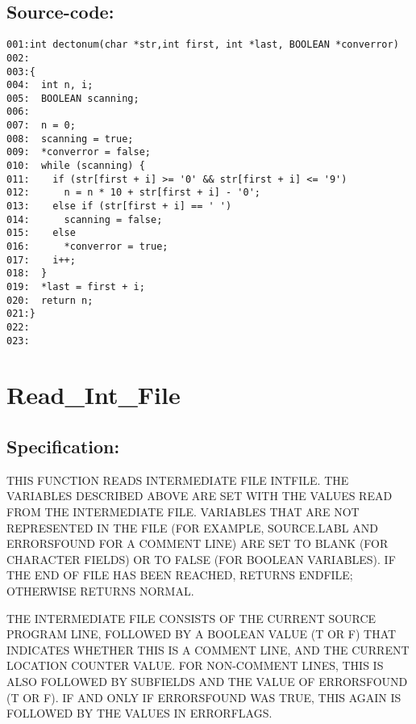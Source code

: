 \subsection*{Source-code:}
\begin{verbatim}
001:int dectonum(char *str,int first, int *last, BOOLEAN *converror)
002:
003:{
004:  int n, i;
005:  BOOLEAN scanning;
006:
007:  n = 0;
008:  scanning = true;
009:  *converror = false;
010:  while (scanning) {
011:    if (str[first + i] >= '0' && str[first + i] <= '9')
012:      n = n * 10 + str[first + i] - '0';
013:    else if (str[first + i] == ' ')
014:      scanning = false;
015:    else 
016:      *converror = true;
017:    i++;
018:  }
019:  *last = first + i;
020:  return n;
021:}
022:
023:
\end{verbatim}
\section{Read\_Int\_File}
\subsection*{Specification:}
THIS FUNCTION READS INTERMEDIATE FILE INTFILE.  THE VARIABLES DESCRIBED ABOVE
ARE SET WITH THE VALUES READ FROM THE INTERMEDIATE FILE. VARIABLES THAT ARE
NOT REPRESENTED IN THE FILE (FOR EXAMPLE, SOURCE.LABL AND ERRORSFOUND FOR A
COMMENT LINE) ARE SET TO BLANK (FOR CHARACTER FIELDS) OR TO FALSE (FOR
BOOLEAN VARIABLES). IF THE END OF FILE HAS BEEN REACHED, RETURNS ENDFILE;
OTHERWISE RETURNS NORMAL.

THE INTERMEDIATE FILE CONSISTS OF THE CURRENT SOURCE PROGRAM LINE, FOLLOWED
BY A BOOLEAN VALUE (T OR F) THAT INDICATES WHETHER THIS IS A COMMENT LINE,
AND THE CURRENT LOCATION COUNTER VALUE. FOR NON-COMMENT LINES, THIS IS ALSO
FOLLOWED BY SUBFIELDS AND THE VALUE OF ERRORSFOUND (T OR F). IF AND ONLY IF
ERRORSFOUND WAS TRUE, THIS AGAIN IS FOLLOWED BY THE VALUES IN ERRORFLAGS.
